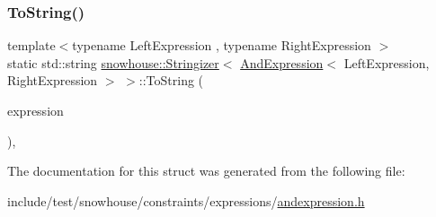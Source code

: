 \subsubsection{\texorpdfstring{ToString()}{ToString()}}
{\footnotesize\ttfamily template$<$typename Left\+Expression , typename Right\+Expression $>$ \\
static std\+::string \mbox{\hyperlink{structsnowhouse_1_1Stringizer}{snowhouse\+::\+Stringizer}}$<$ \mbox{\hyperlink{structsnowhouse_1_1AndExpression}{And\+Expression}}$<$ Left\+Expression, Right\+Expression $>$ $>$\+::To\+String (\begin{DoxyParamCaption}\item[{const \mbox{\hyperlink{structsnowhouse_1_1AndExpression}{And\+Expression}}$<$ Left\+Expression, Right\+Expression $>$ \&}]{expression }\end{DoxyParamCaption})\hspace{0.3cm}{\ttfamily [inline]}, {\ttfamily [static]}}



The documentation for this struct was generated from the following file\+:\begin{DoxyCompactItemize}
\item 
include/test/snowhouse/constraints/expressions/\mbox{\hyperlink{andexpression_8h}{andexpression.\+h}}\end{DoxyCompactItemize}
